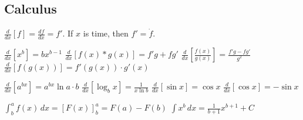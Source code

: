 \begin{center}\section{Calculus}\end{center}

\newcommand{\DERIVATIVE}{\frac{d}{dx}}

$ \DERIVATIVE[f] = \frac{df}{dx} = f' $. If $x$ is time, then $ f' =
\dot{f} $.

\vspace{1em}

$ \DERIVATIVE[x^b] = bx^{b-1} $
\hspace{5ex}
$ \DERIVATIVE[f(x) * g(x)] = f'g + fg' $
\hspace{5ex}
$ \DERIVATIVE[\frac{f(x)}{g(x)}] = \frac{f'g - fg'}{g^2} $
\hspace{5ex}
$ \DERIVATIVE[f(g(x))] = f'(g(x)) \cdot g'(x) $

\vspace{1em}

$ \DERIVATIVE[a^{bx}] = a^{bx}\ln{a} \cdot b $
\hspace{5ex}
$ \DERIVATIVE[\log_b{x}] = \frac{1}{x\ln{b}} $
\hspace{5ex}
$ \DERIVATIVE[\sin{x}] = \cos{x} $
\hspace{5ex}
$ \DERIVATIVE[\cos{x}] = -\sin{x} $

\vspace{1em}

$ \int_b^a f(x)\,dx = [F(x)]_b^a = F(a) - F(b)$
\hspace{5ex}
$ \int x^b\,dx = \frac{1}{b+1}x^{b+1} + C $
\hspace{5ex}

